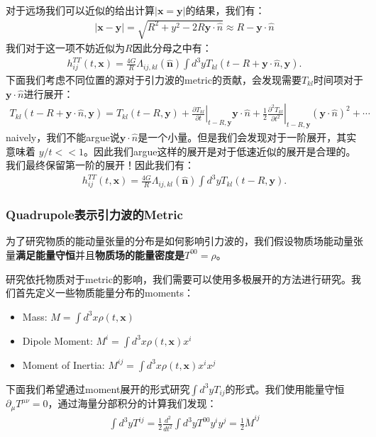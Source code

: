 \bigskip
{}

对于远场我们可以近似的给出计算$ | \mathbf{x} = \mathbf{y} | $的结果，我们有：
\begin{align}
  |\mathbf{x}-\mathbf{y}| = \sqrt{R^2 + y^2 - 2 R \mathbf{y} \cdot
  \hat{n}} \approx R - \mathbf{y} \cdot \hat{n}
\end{align}
我们对于这一项不妨近似为$ R $因此分母之中有：
\begin{align}
  h_{ij}^{TT}(t,\mathbf{x}) = \frac{4G}{R}
  \Lambda_{ij,kl}(\hat{\mathbf{n}}) \int d^3 y T_{kl}\left(t - R +
  \mathbf{y} \cdot \hat{n}, \mathbf{y} \right).
\end{align}
下面我们考虑不同位置的源对于引力波的metric的贡献，会发现需要$ T_{kl} $时间项对于$ \mathbf{y} \cdot
\hat{n} $进行展开：
\begin{align}
  T_{kl}\left(t - R + \mathbf{y} \cdot \hat{n}, \mathbf{y} \right) =
  T_{kl}(t - R, \mathbf{y}) + \left. \frac{\partial T_{kl}}{\partial
  t} \right|_{t-R,\mathbf{y}} \mathbf{y} \cdot \hat{n} + \frac{1}{2}
  \left. \frac{\partial^2 T_{kl}}{\partial t^2}
  \right|_{t-R,\mathbf{y}} (\mathbf{y} \cdot \hat{n})^2 + \cdots
\end{align}
naively，我们不能argue说$ \mathbf{y} \cdot \hat{n}
$是一个小量。但是我们会发现对于一阶展开，其实意味着 $ y/t << 1
$。因此我们argue这样的展开是对于低速近似的展开是合理的。我们最终保留第一阶的展开！因此我们有：
\begin{align}
  h_{ij}^{TT}(t,\mathbf{x}) = \frac{4G}{R}
  \Lambda_{ij,kl}(\hat{\mathbf{n}}) \int d^3 y T_{kl}(t - R, \mathbf{y}).
\end{align}

\subsubsection{Quadrupole表示引力波的Metric}

为了研究物质的能动量张量的分布是如何影响引力波的，我们假设物质场能动量张量\textbf{满足能量守恒}并且\textbf{物质场的能量密度是}$
T^{00} = \rho $。

\bigskip
{}

研究依托物质对于metric的影响，我们需要可以使用多极展开的方法进行研究。我们首先定义一些物质能量分布的moments：
\begin{itemize}
  \item Mass: $ M = \int d^3 x \rho(t,\mathbf{x}) $
  \item Dipole Moment: $ M^i = \int d^3 x \rho(t,\mathbf{x}) x^i $
  \item Moment of Inertia: $ M^{ij} = \int d^3 x \rho(t,\mathbf{x}) x^i x^j $
\end{itemize}
下面我们希望通过moment展开的形式研究$ \int d^3 y T_{ij} $的形式。我们使用能量守恒$ \partial_\mu
T^{\mu \nu} = 0 $，通过海量分部积分的计算我们发现：
\begin{align}
  \int d^3 y T^{ij} = \frac{1}{2} \frac{d^2}{dt^2} \int d^3 y T^{00}
  y^i y^j = \frac{1}{2} \ddot{M}^{ij}
\end{align}

